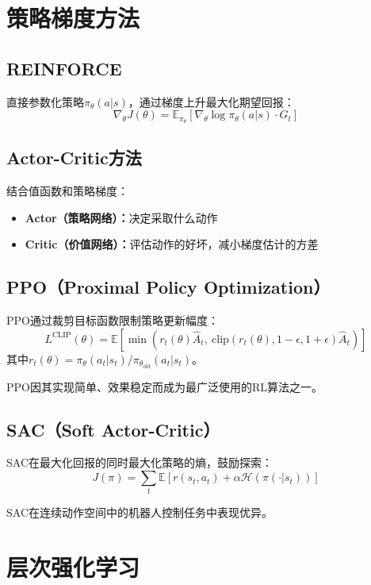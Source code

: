 \section{策略梯度方法 \ug}

\subsection{REINFORCE}

直接参数化策略$\pi_\theta(a|s)$，通过梯度上升最大化期望回报：
$$\nabla_\theta J(\theta) = \mathbb{E}_{\pi_\theta}\left[ \nabla_\theta \log \pi_\theta(a|s) \cdot G_t \right]$$

\subsection{Actor-Critic方法 \ug}

结合值函数和策略梯度：
\begin{itemize}
  \item \textbf{Actor（策略网络）：}决定采取什么动作
  \item \textbf{Critic（价值网络）：}评估动作的好坏，减小梯度估计的方差
\end{itemize}

\subsection{PPO（Proximal Policy Optimization） \grad}

PPO通过裁剪目标函数限制策略更新幅度：
$$L^{\mathrm{CLIP}}(\theta) = \mathbb{E}\left[\min\left(r_t(\theta)\hat{A}_t,\ \mathrm{clip}(r_t(\theta), 1-\epsilon, 1+\epsilon)\hat{A}_t\right)\right]$$
其中$r_t(\theta) = \pi_\theta(a_t|s_t)/\pi_{\theta_{\mathrm{old}}}(a_t|s_t)$。

PPO因其实现简单、效果稳定而成为最广泛使用的RL算法之一。

\subsection{SAC（Soft Actor-Critic） \grad}

SAC在最大化回报的同时最大化策略的熵，鼓励探索：
$$J(\pi) = \sum_t \mathbb{E}\left[ r(s_t, a_t) + \alpha \mathcal{H}(\pi(\cdot|s_t)) \right]$$

SAC在连续动作空间中的机器人控制任务中表现优异。

\section{层次强化学习 \grad}

